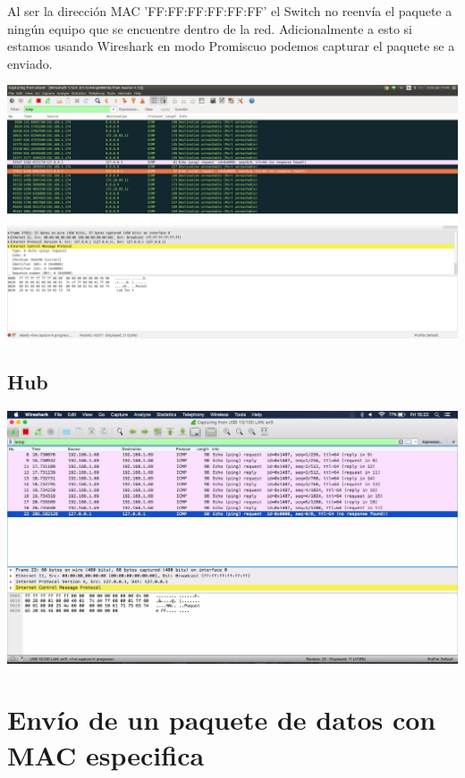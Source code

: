 \documentclass[spanish]{udpreport}
\begin{document}
Al ser la dirección MAC 'FF:FF:FF:FF:FF:FF' el Switch no reenvía el paquete a ningún equipo que se encuentre dentro de la red. Adicionalmente a esto si estamos usando Wireshark en modo Promiscuo podemos capturar el paquete se a enviado.


\begin{center}
	\includegraphics[scale=.37]{imagenes/Switch/Test_1_Wireshark.png}
\end{center}



\subsection{Hub}

\begin{center}
	\includegraphics[scale=.37]{imagenes/Hub/Test_1_Wireshark.jpg}
\end{center}
\newpage
\section{Envío de un paquete de datos con MAC especifica}
\end{document}
